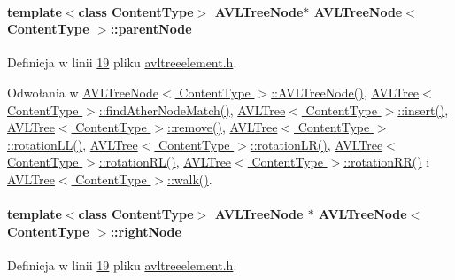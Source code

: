\hypertarget{class_a_v_l_tree_node_ae64d1261fea217d3e85928e7cf2a9151}{
\paragraph[{parent\-Node}]{\setlength{\rightskip}{0pt plus 5cm}template$<$class Content\-Type$>$ {\bf A\-V\-L\-Tree\-Node}$\ast$ {\bf A\-V\-L\-Tree\-Node}$<$ Content\-Type $>$\-::parent\-Node}}\label{class_a_v_l_tree_node_ae64d1261fea217d3e85928e7cf2a9151}


Definicja w linii \hyperlink{avltreeelement_8h_source_l00019}{19} pliku \hyperlink{avltreeelement_8h_source}{avltreeelement.\-h}.



Odwołania w \hyperlink{avltreeelement_8h_source_l00027}{A\-V\-L\-Tree\-Node$<$ Content\-Type $>$\-::\-A\-V\-L\-Tree\-Node()}, \hyperlink{avltree_8h_source_l00253}{A\-V\-L\-Tree$<$ Content\-Type $>$\-::find\-Ather\-Node\-Match()}, \hyperlink{avltree_8h_source_l00040}{A\-V\-L\-Tree$<$ Content\-Type $>$\-::insert()}, \hyperlink{avltree_8h_source_l00271}{A\-V\-L\-Tree$<$ Content\-Type $>$\-::remove()}, \hyperlink{avltree_8h_source_l00151}{A\-V\-L\-Tree$<$ Content\-Type $>$\-::rotation\-L\-L()}, \hyperlink{avltree_8h_source_l00201}{A\-V\-L\-Tree$<$ Content\-Type $>$\-::rotation\-L\-R()}, \hyperlink{avltree_8h_source_l00177}{A\-V\-L\-Tree$<$ Content\-Type $>$\-::rotation\-R\-L()}, \hyperlink{avltree_8h_source_l00125}{A\-V\-L\-Tree$<$ Content\-Type $>$\-::rotation\-R\-R()} i \hyperlink{avltree_8h_source_l00370}{A\-V\-L\-Tree$<$ Content\-Type $>$\-::walk()}.

\hypertarget{class_a_v_l_tree_node_a51dfb148f27625c89a3a153760517c38}{
\paragraph[{right\-Node}]{\setlength{\rightskip}{0pt plus 5cm}template$<$class Content\-Type$>$ {\bf A\-V\-L\-Tree\-Node} $\ast$ {\bf A\-V\-L\-Tree\-Node}$<$ Content\-Type $>$\-::right\-Node}}\label{class_a_v_l_tree_node_a51dfb148f27625c89a3a153760517c38}


Definicja w linii \hyperlink{avltreeelement_8h_source_l00019}{19} pliku \hyperlink{avltreeelement_8h_source}{avltreeelement.\-h}.




